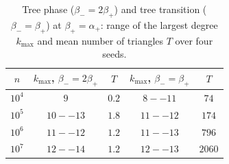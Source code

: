 \documentclass[aps,pre,twocolumn,superscriptaddress,floatfix,nofootinbib]{revtex4-2}
\begin{document}
\begin{table}[t]
\caption{Tree phase ($\beta_-=2\beta_+$) and tree transition ($\beta_-=\beta_+$)
at $\beta_+=\alpha_+$: range of the largest degree $k_{\max}$ and mean number
of triangles $T$ over four seeds.}
\label{tab:tree}
\begin{ruledtabular}
\begin{tabular}{ccccc}
$n$ & $k_{\max}$, $\beta_-=2\beta_+$ & $T$ & $k_{\max}$, $\beta_-=\beta_+$ & $T$\\
\hline
$10^4$ & $9$ & $0.2$ & $8--11$ & $74$\\
$10^5$ & $10--13$ & $1.8$ & $11--12$ & $174$\\
$10^6$ & $11--12$ & $1.2$ & $11--13$ & $796$\\
$10^7$ & $12--14$ & $1.2$ & $12--13$ & $2060$\\
\end{tabular}
\end{ruledtabular}
\end{table}
\end{document}
